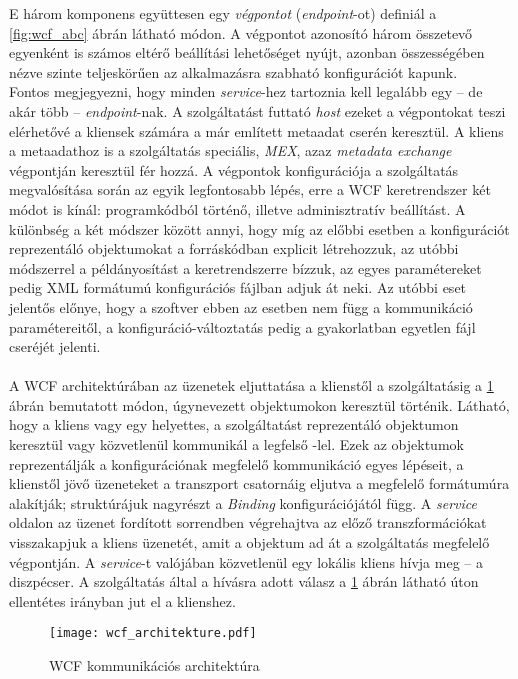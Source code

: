 E három komponens együttesen egy \emph{végpontot} (\emph{endpoint}-ot) definiál a \ref{fig:wcf_abc} ábrán látható módon.
A végpontot azonosító három összetevő egyenként is számos eltérő beállítási lehetőséget nyújt, azonban összességében nézve szinte teljeskörűen az alkalmazásra szabható konfigurációt kapunk.\\
Fontos megjegyezni, hogy minden \emph{service}-hez tartoznia kell legalább egy -- de akár több -- \emph{endpoint}-nak. A szolgáltatást futtató \emph{host} ezeket a végpontokat teszi elérhetővé a kliensek számára a már említett metaadat cserén keresztül. A kliens a metaadathoz is a szolgáltatás speciális, \emph{MEX}, azaz \emph{metadata exchange} végpontján keresztül fér hozzá. A végpontok konfigurációja a szolgáltatás megvalósítása során az egyik legfontosabb lépés, erre a WCF keretrendszer két módot is kínál: programkódból történő, illetve adminisztratív beállítást. A különbség a két módszer között annyi, hogy míg az előbbi esetben a konfigurációt reprezentáló objektumokat a forráskódban explicit létrehozzuk, az utóbbi módszerrel a példányosítást a keretrendszerre bízzuk, az egyes paramétereket pedig XML formátumú konfigurációs fájlban adjuk át neki. Az utóbbi eset jelentős előnye, hogy a szoftver ebben az esetben nem függ a kommunikáció paramétereitől, a konfiguráció-változtatás pedig a gyakorlatban egyetlen fájl cseréjét jelenti. \cite{wcf-doc} \\
\\
A WCF architektúrában az üzenetek eljuttatása a klienstől a szolgáltatásig a \ref{fig:wcf_architekture} ábrán bemutatott módon, úgynevezett  objektumokon keresztül történik. Látható, hogy a kliens vagy egy helyettes, a szolgáltatást reprezentáló objektumon keresztül vagy közvetlenül kommunikál a legfelső -lel. Ezek az objektumok reprezentálják a konfigurációnak megfelelő kommunikáció egyes lépéseit, a klienstől jövő üzeneteket a transzport csatornáig eljutva a megfelelő formátumúra alakítják; struktúrájuk nagyrészt a \emph{Binding} konfigurációjától függ. A \emph{service} oldalon az üzenet fordított sorrendben végrehajtva az előző transzformációkat visszakapjuk a kliens üzenetét, amit a  objektum ad át a szolgáltatás megfelelő végpontján. A \emph{service}-t valójában közvetlenül egy lokális kliens hívja meg -- a diszpécser. A szolgáltatás által a hívásra adott válasz a \ref{fig:wcf_architekture} ábrán látható úton ellentétes irányban jut el a klienshez. \cite{wcf-programming}

\begin{figure}[h]
\vspace{.5cm}
\texttt{[image: wcf\_architekture.pdf]}
\centering
\vspace{.2cm}
\caption{WCF kommunikációs architektúra}
\vspace{.5cm}
\label{fig:wcf_architekture}
\end{figure}

